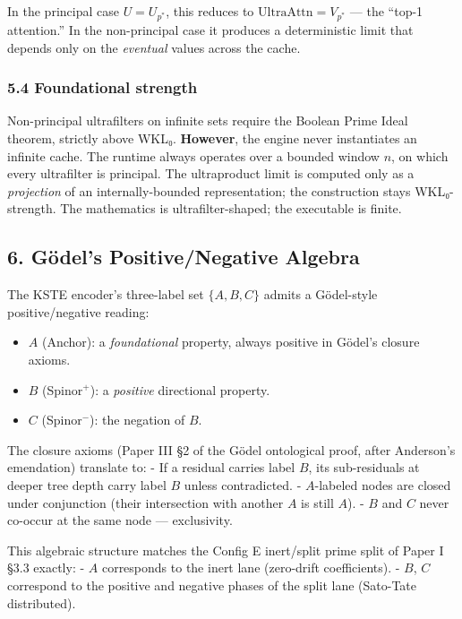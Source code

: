 \documentclass[
  11pt,
]{article}
\providecommand{\tightlist}{%
  \setlength{\itemsep}{0pt}\setlength{\parskip}{0pt}}
\begin{document}
In the principal case \(U = U_{p^*}\), this reduces to
\(\mathrm{UltraAttn} = V_{p^*}\) --- the ``top-1 attention.'' In the
non-principal case it produces a deterministic limit that depends only
on the \emph{eventual} values across the cache.

\hypertarget{foundational-strength}{%
\subsubsection{5.4 Foundational strength}\label{foundational-strength}}

Non-principal ultrafilters on infinite sets require the Boolean Prime
Ideal theorem, strictly above WKL₀. \textbf{However}, the engine never
instantiates an infinite cache. The runtime always operates over a
bounded window \(n\), on which every ultrafilter is principal. The
ultraproduct limit is computed only as a \emph{projection} of an
internally-bounded representation; the construction stays WKL₀-strength.
The mathematics is ultrafilter-shaped; the executable is finite.

\hypertarget{guxf6dels-positivenegative-algebra}{%
\subsection{6. Gödel's Positive/Negative
Algebra}\label{guxf6dels-positivenegative-algebra}}

The KSTE encoder's three-label set \(\{A, B, C\}\) admits a Gödel-style
positive/negative reading:

\begin{itemize}
\tightlist
\item
  \(A\) (Anchor): a \emph{foundational} property, always positive in
  Gödel's closure axioms.
\item
  \(B\) (Spinor\(^+\)): a \emph{positive} directional property.
\item
  \(C\) (Spinor\(^-\)): the negation of \(B\).
\end{itemize}

The closure axioms (Paper III §2 of the Gödel ontological proof, after
Anderson's emendation) translate to: - If a residual carries label
\(B\), its sub-residuals at deeper tree depth carry label \(B\) unless
contradicted. - \(A\)-labeled nodes are closed under conjunction (their
intersection with another \(A\) is still \(A\)). - \(B\) and \(C\) never
co-occur at the same node --- exclusivity.

This algebraic structure matches the Config E inert/split prime split of
Paper I §3.3 exactly: - \(A\) corresponds to the inert lane (zero-drift
coefficients). - \(B\), \(C\) correspond to the positive and negative
phases of the split lane (Sato-Tate distributed).
\end{document}
